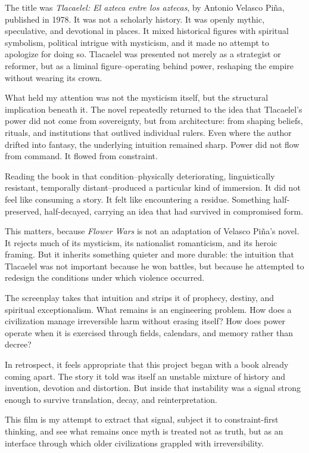 \documentclass[12pt]{article}
\begin{document}
The title was \textit{Tlacaelel: El azteca entre los aztecas}, by Antonio Velasco Piña, published in 1978. It was not a scholarly history. It was openly mythic, speculative, and devotional in places. It mixed historical figures with spiritual symbolism, political intrigue with mysticism, and it made no attempt to apologize for doing so. Tlacaelel was presented not merely as a strategist or reformer, but as a liminal figure--operating behind power, reshaping the empire without wearing its crown.

What held my attention was not the mysticism itself, but the structural implication beneath it. The novel repeatedly returned to the idea that Tlacaelel's power did not come from sovereignty, but from architecture: from shaping beliefs, rituals, and institutions that outlived individual rulers. Even where the author drifted into fantasy, the underlying intuition remained sharp. Power did not flow from command. It flowed from constraint.

Reading the book in that condition--physically deteriorating, linguistically resistant, temporally distant--produced a particular kind of immersion. It did not feel like consuming a story. It felt like encountering a residue. Something half-preserved, half-decayed, carrying an idea that had survived in compromised form.

This matters, because \textit{Flower Wars} is not an adaptation of Velasco Piña's novel. It rejects much of its mysticism, its nationalist romanticism, and its heroic framing. But it inherits something quieter and more durable: the intuition that Tlacaelel was not important because he won battles, but because he attempted to redesign the conditions under which violence occurred.

The screenplay takes that intuition and strips it of prophecy, destiny, and spiritual exceptionalism. What remains is an engineering problem. How does a civilization manage irreversible harm without erasing itself? How does power operate when it is exercised through fields, calendars, and memory rather than decree?

In retrospect, it feels appropriate that this project began with a book already coming apart. The story it told was itself an unstable mixture of history and invention, devotion and distortion. But inside that instability was a signal strong enough to survive translation, decay, and reinterpretation.

This film is my attempt to extract that signal, subject it to constraint-first thinking, and see what remains once myth is treated not as truth, but as an interface through which older civilizations grappled with irreversibility.
\end{document}
